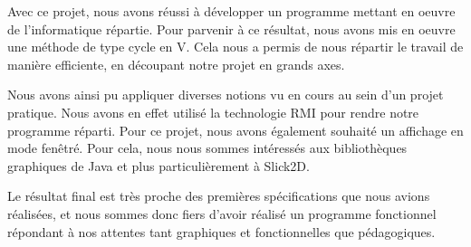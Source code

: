 

Avec ce projet, nous avons réussi à développer un programme mettant en oeuvre de l'informatique répartie. Pour parvenir à ce résultat, nous avons mis en oeuvre une méthode de type cycle en V. Cela nous a permis de nous répartir le travail de manière efficiente, en découpant notre projet en grands axes.

Nous avons ainsi pu appliquer diverses notions vu en cours au sein d'un projet pratique. Nous avons en effet utilisé la technologie RMI pour rendre notre programme réparti. Pour ce projet, nous avons également souhaité un affichage en mode fenêtré. Pour cela, nous nous sommes intéressés aux bibliothèques graphiques de Java et plus particulièrement à Slick2D.

Le résultat final est très proche des premières spécifications que nous avions réalisées, et nous sommes donc fiers d'avoir réalisé un programme fonctionnel répondant à nos attentes tant graphiques et fonctionnelles que pédagogiques.